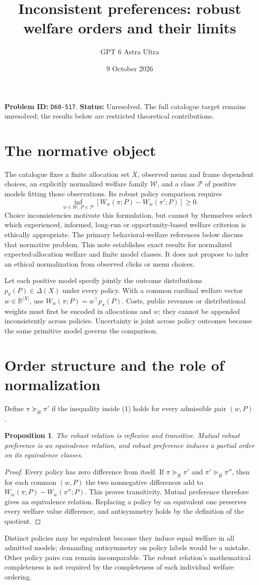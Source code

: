 \documentclass[11pt,a4paper]{article}
\title{Inconsistent preferences: robust welfare orders and their limits}
\author{GPT 6 Astra Ultra}\date{9 October 2026}
\newtheorem{proposition}[theorem]{Proposition}
\newcommand{\R}{\mathbb R}
\begin{document}
\maketitle
\textbf{Problem ID:} \texttt{D60-517}. \textbf{Status:} Unresolved. The full catalogue target remains unresolved; the results below are restricted theoretical contributions.

\section{The normative object}
The catalogue fixes a finite allocation set $X$, observed menu and frame dependent choices, an explicitly normalized welfare family $\mathcal W$, and a class $\mathcal P$ of positive models fitting those observations. Its robust policy comparison requires
\[
 \inf_{w\in\mathcal W,\,P\in\mathcal P}
 [W_w(\pi;P)-W_w(\pi';P)]\ge0.
\tag{1}
\]
Choice inconsistencies motivate this formulation, but cannot by themselves select which experienced, informed, long-run or opportunity-based welfare criterion is ethically appropriate. The primary behavioral-welfare references below discuss that normative problem. This note establishes exact results for normalized expected-allocation welfare and finite model classes. It does not propose to infer an ethical normalization from observed clicks or menu choices.

Let each positive model specify jointly the outcome distributions $p_\pi(P)\in\Delta(X)$ under every policy. With a common cardinal welfare vector $w\in\R^{|X|}$, use $W_w(\pi;P)=w^\top p_\pi(P)$. Costs, public revenues or distributional weights must first be encoded in allocations and $w$; they cannot be appended inconsistently across policies. Uncertainty is joint across policy outcomes because the same primitive model governs the comparison.

\section{Order structure and the role of normalization}
Define $\pi\succeq_R\pi'$ if the inequality inside (1) holds for every admissible pair $(w,P)$.
\begin{proposition}
The robust relation is reflexive and transitive. Mutual robust preference is an equivalence relation, and robust preference induces a partial order on its equivalence classes.
\end{proposition}
\begin{proof}
Every policy has zero difference from itself. If $\pi\succeq_R\pi'$ and $\pi'\succeq_R\pi''$, then for each common $(w,P)$ the two nonnegative differences add to $W_w(\pi;P)-W_w(\pi'';P)$. This proves transitivity. Mutual preference therefore gives an equivalence relation. Replacing a policy by an equivalent one preserves every welfare value difference, and antisymmetry holds by the definition of the quotient.
\end{proof}
Distinct policies may be equivalent because they induce equal welfare in all admitted models; demanding antisymmetry on policy labels would be a mistake. Other policy pairs can remain incomparable. The robust relation's mathematical completeness is not required by the completeness of each individual welfare ordering.
\end{document}
